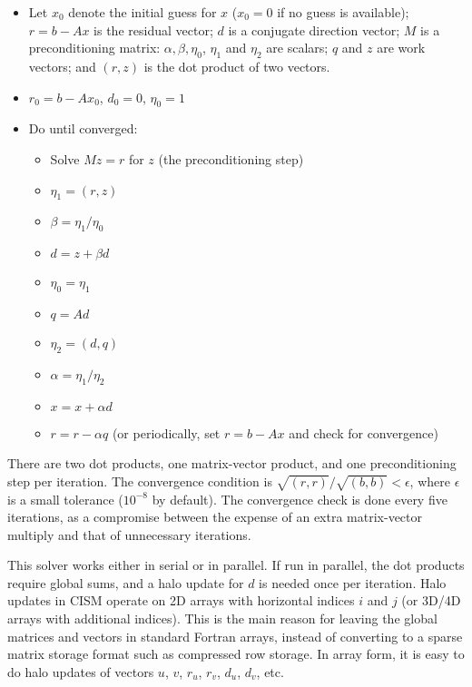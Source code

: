 {\begin{itemize}

\item Let $x_0$ denote the initial guess for $x$ ($x_0 = 0$ if no guess is available);
$r = b - Ax$ is the residual vector; $d$ is a conjugate direction vector;
$M$ is a preconditioning matrix: $\alpha, \beta, \eta_0$, $\eta_1$ and $\eta_2$ are scalars;
$q$ and $z$ are work vectors; and $(r,z)$ is the dot product of two vectors.

\item $r_0 = b - A x_0$, $d_0 = 0$, $\eta_0 = 1$ 

\item Do until converged:
  \begin{itemize}
\renewcommand{\labelitemii}{$\star$}
  \item Solve $M z = r$ for $z$ (the preconditioning step)
  \item $\eta_1 = (r,z)$
  \item $\beta = \eta_1/\eta_0$
  \item $d = z + \beta d$
  \item $\eta_0 = \eta_1$
  \item $q = A d$
  \item $\eta_2 = (d,q)$
  \item $\alpha = \eta_1/\eta_2$
  \item $x = x + \alpha d$
  \item $r = r - \alpha q$ (or periodically, set $r = b - A x$ and check for convergence)
  \end{itemize}
\end{itemize}

\noindent
There are two dot products, one matrix-vector product, and one preconditioning step per iteration.
The convergence condition is $\sqrt{(r,r)}/\sqrt{(b,b)} < \epsilon$, where $\epsilon$ is a small tolerance
($10^{-8}$ by default).
The convergence check is done every five iterations, as a compromise
between the expense of an extra matrix-vector multiply and that of unnecessary iterations.

This solver works either in serial or in parallel.  If run in parallel, the dot products
require global sums, and a halo update for $d$ is needed once per iteration.
Halo updates in CISM operate on 2D arrays with horizontal indices $i$ and $j$ (or 3D/4D 
arrays with additional indices).  This is the main reason for
leaving the global matrices and vectors in standard Fortran arrays, instead of
converting to a sparse matrix storage format such as compressed row storage.
In array form, it is easy to do halo updates of vectors $u$, $v$, $r_u$, $r_v$, $d_u$, $d_v$, etc.

}
